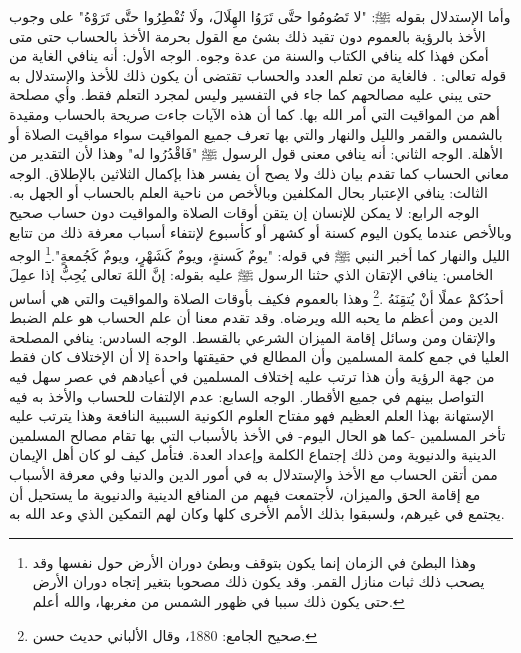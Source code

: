 وأما الإستدلال بقوله ﷺ: "لا تَصُومُوا حتَّى تَرَوُا الهِلَالَ، ولَا تُفْطِرُوا حتَّى تَرَوْهُ" على وجوب الأخذ بالرؤية بالعموم دون تقيد ذلك بشئ مع القول بحرمة الأخذ بالحساب حتى متى أمكن فهذا كله ينافي الكتاب والسنة من عدة وجوه. الوجه الأول: أنه ينافي الغاية من قوله تعالى: \quranayah*[10][5] {\footnotesize (\surahname*[10])}. فالغاية من تعلم العدد والحساب تقتضى أن يكون ذلك للأخذ والإستدلال به حتى يبني عليه مصالحهم كما جاء في التفسير وليس لمجرد التعلم فقط. وأي مصلحة أهم من المواقيت التي أمر الله بها. كما أن هذه الآيات جاءت صريحة  بالحساب ومقيدة بالشمس والقمر والليل والنهار والتي بها تعرف جميع المواقيت سواء مواقيت الصلاة أو الأهلة. الوجه الثاني: أنه ينافي معنى قول الرسول ﷺ "فَاقْدُرُوا له" وهذا لأن التقدير من معاني الحساب كما تقدم بيان ذلك ولا يصح أن يفسر هذا بإكمال الثلاثين بالإطلاق. الوجه الثالث: ينافي الإعتبار بحال المكلفين وبالأخص من ناحية العلم بالحساب أو الجهل به. الوجه الرابع: لا يمكن للإنسان إن يتقن أوقات الصلاة والمواقيت دون حساب صحيح وبالأخص عندما يكون اليوم كسنة أو كشهر أو كأسبوع لإنتفاء أسباب معرفة ذلك من تتابع الليل والنهار كما أخبر النبي ﷺ في قوله: "يومٌ كَسنةٍ، ويومٌ كَشَهْرٍ، ويومٌ كَجُمعةٍ".\footnote{وهذا البطئ في الزمان إنما يكون بتوقف وبطئ دوران الأرض حول نفسها وقد يصحب ذلك ثبات منازل القمر. وقد يكون ذلك مصحوبا بتغير إتجاه دوران الأرض حتى يكون ذلك سببا في ظهور الشمس من مغربها، والله أعلم.} الوجه الخامس: ينافي الإتقان الذي حثنا الرسول ﷺ عليه بقوله: إنَّ اللهَ تعالى يُحِبُّ إذا عمِلَ أحدُكمْ عملًا أنْ يُتقِنَهُ \href{https://shamela.ws/book/21659/2761#p1}{\faExternalLink} \cite{jamaaSagheer}.\footnote{صحيح الجامع: 1880، وقال الألباني حديث حسن.} وهذا بالعموم فكيف بأوقات الصلاة والمواقيت والتي هي أساس الدين ومن أعظم ما يحبه الله ويرضاه. وقد تقدم معنا أن علم الحساب هو علم الضبط والإتقان ومن وسائل إقامة الميزان الشرعي بالقسط. الوجه السادس: ينافي المصلحة العليا في جمع كلمة المسلمين وأن المطالع في حقيقتها واحدة إلا أن الإختلاف كان فقط من جهة الرؤية وأن هذا ترتب عليه إختلاف المسلمين في أعيادهم في عصر سهل فيه التواصل بينهم في جميع الأقطار. الوجه السابع: عدم الإلتفات للحساب والأخذ به فيه الإستهانة بهذا العلم العظيم فهو مفتاح العلوم الكونية السببية النافعة وهذا يترتب عليه تأخر المسلمين -كما هو الحال اليوم- في الأخذ بالأسباب التي بها تقام مصالح المسلمين الدينية والدنيوية ومن ذلك إجتماع الكلمة وإعداد العدة. فتأمل كيف لو كان أهل الإيمان ممن أتقن الحساب مع الأخذ والإستدلال به في أمور الدين والدنيا وفي معرفة الأسباب مع إقامة الحق والميزان، لأجتمعت فيهم من المنافع الدينية والدنيوية ما يستحيل أن يجتمع في غيرهم، ولسبقوا بذلك الأمم الأخرى كلها وكان لهم التمكين الذي وعد الله به.

